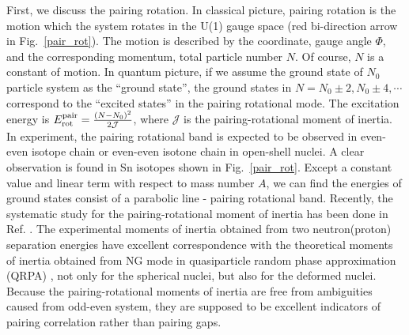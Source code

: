 \documentclass[11pt]{book} %
\begin{document}
First, we discuss the pairing rotation. In classical picture, pairing rotation is the motion which the system rotates in the U(1) gauge space (red bi-direction arrow in Fig.~\ref{pair_rot}). The motion is described by the coordinate, gauge angle $\Phi$, and the corresponding momentum, total particle number $N$. 
Of course, $N$ is a constant of motion. In quantum picture, if we assume the ground state of $N_0$ particle system as the ``ground state'', the ground states in $N=N_0\pm2, N_0\pm4,\cdots$ correspond to the ``excited states'' in the pairing rotational mode. The excitation energy is $E_{\rm rot}^{\rm pair}=\frac{(N-N_0)^2}{2\mathcal{J}}$, where $\mathcal{J}$ is the pairing-rotational moment of inertia. In experiment, the pairing rotational band is expected to be observed in even-even isotope chain or even-even isotone chain in open-shell nuclei. A clear observation is found in Sn isotopes shown in Fig.~\ref{pair_rot}. Except a constant value and linear term with respect to mass number $A$, we can find the energies of ground states consist of a parabolic line - pairing rotational band. Recently, the systematic study for the pairing-rotational moment of inertia has been done in Ref. \cite{HN16}. The experimental moments of inertia obtained from two neutron(proton) separation energies have excellent correspondence with the theoretical moments of inertia obtained from NG mode in quasiparticle random phase approximation (QRPA) \cite{TV61}, not only for the spherical nuclei, but also for the deformed nuclei. Because the pairing-rotational moments of inertia are free from ambiguities caused from odd-even system, they are supposed to be excellent indicators of pairing correlation rather than pairing gaps.
\end{document}
